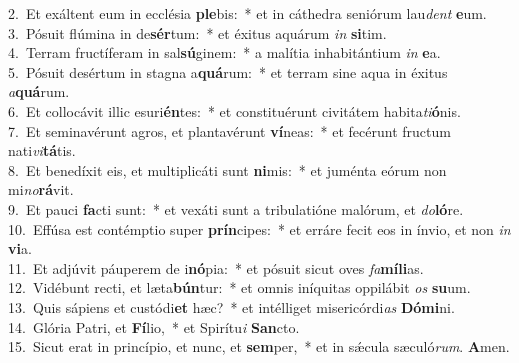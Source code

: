 {2.~}Et exáltent eum in ecclésia \textbf{ple}bis:~* et in cáthedra seniórum lau\textit{dent} \textbf{e}um.\\
{3.~}Pósuit flúmina in de\textbf{sér}tum:~* et éxitus aquárum \textit{in} \textbf{si}tim.\\
{4.~}Terram fructíferam in sal\textbf{sú}ginem:~* a malítia inhabitántium \textit{in} \textbf{e}a.\\
{5.~}Pósuit desértum in stagna a\textbf{quá}rum:~* et terram sine aqua in éxitus \textit{a}\textbf{quá}rum.\\
{6.~}Et collocávit illic esuri\textbf{én}tes:~* et constituérunt civitátem habita\textit{ti}\textbf{ó}nis.\\
{7.~}Et seminavérunt agros, et plantavérunt \textbf{ví}neas:~* et fecérunt fructum nati\textit{vi}\textbf{tá}tis.\\
{8.~}Et benedíxit eis, et multiplicáti sunt \textbf{ni}mis:~* et juménta eórum non mi\textit{no}\textbf{rá}vit.\\
{9.~}Et pauci \textbf{fa}cti sunt:~* et vexáti sunt a tribulatióne malórum, et \textit{do}\textbf{ló}re.\\
{10.~}Effúsa est contémptio super \textbf{prín}cipes:~* et erráre fecit eos in ínvio, et non \textit{in} \textbf{vi}a.\\
{11.~}Et adjúvit páuperem de i\textbf{nó}pia:~* et pósuit sicut oves \textit{fa}\textbf{mí}\textbf{li}as.\\
{12.~}Vidébunt recti, et læta\textbf{bún}tur:~* et omnis iníquitas oppilábit \textit{os} \textbf{su}um.\\
{13.~}Quis sápiens et custódi\textbf{et} hæc?~* et intélliget misericórdi\textit{as} \textbf{Dó}\textbf{mi}ni.\\
{14.~}Glória Patri, et \textbf{Fí}lio,~* et Spirítu\textit{i} \textbf{San}cto.\\
{15.~}Sicut erat in princípio, et nunc, et \textbf{sem}per,~* et in sǽcula sæculó\textit{rum}. \textbf{A}men.\\
